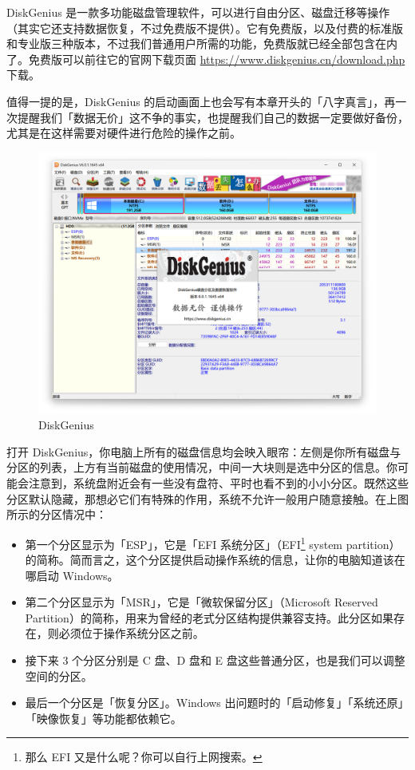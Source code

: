 {DiskGenius 是一款多功能磁盘管理软件，可以进行自由分区、磁盘迁移等操作（其实它还支持数据恢复，不过免费版不提供）。它有免费版，以及付费的标准版和专业版三种版本，不过我们普通用户所需的功能，免费版就已经全部包含在内了。免费版可以前往它的官网下载页面 \url{https://www.diskgenius.cn/download.php} 下载。

值得一提的是，DiskGenius 的启动画面上也会写有本章开头的「八字真言」，再一次提醒我们「数据无价」这不争的事实，也提醒我们自己的数据一定要做好备份，尤其是在这样需要对硬件进行危险的操作之前。

\begin{figure}[htb!]
  \centering
  \includegraphics[width=.65\textwidth]{assets/advanced/DiskGenius.png}
  \caption{DiskGenius}
  \label{fig:DiskGenius}
\end{figure}

打开 DiskGenius，你电脑上所有的磁盘信息均会映入眼帘：左侧是你所有磁盘与分区的列表，上方有当前磁盘的使用情况，中间一大块则是选中分区的信息。你可能会注意到，系统盘附近会有一些没有盘符、平时也看不到的小小分区。既然这些分区默认隐藏，那想必它们有特殊的作用，系统不允许一般用户随意接触。在上图所示的分区情况中：

\begin{itemize}
  \item 第一个分区显示为「ESP」，它是「EFI 系统分区」（EFI\footnote{那么 EFI 又是什么呢？你可以自行上网搜索。} system partition）的简称。简而言之，这个分区提供启动操作系统的信息，让你的电脑知道该在哪启动 Windows。
  \item 第二个分区显示为「MSR」，它是「微软保留分区」（Microsoft Reserved Partition）的简称，用来为曾经的老式分区结构提供兼容支持。此分区如果存在，则必须位于操作系统分区之前。
  \item 接下来 3 个分区分别是 C 盘、D 盘和 E 盘这些普通分区，也是我们可以调整空间的分区。
  \item 最后一个分区是「恢复分区」。Windows 出问题时的「启动修复」「系统还原」「映像恢复」等功能都依赖它。
\end{itemize}

}

